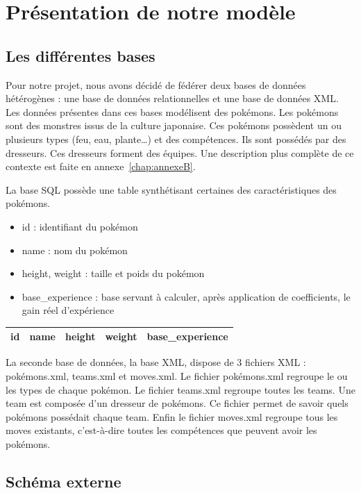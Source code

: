 \section{Présentation de notre modèle}

\subsection{Les différentes bases}

Pour notre projet, nous avons décidé de fédérer deux bases de données hétérogènes : une base de données relationnelles et une base de données XML. Les données présentes dans ces bases modélisent des pokémons. Les pokémons sont des monstres issus de la culture japonaise. Ces pokémons possèdent un ou plusieurs types (feu, eau, plante…) et des compétences. Ils sont possédés par des dresseurs. Ces dresseurs forment des équipes. Une description plus complète de ce contexte est faite en annexe~\ref{chap:annexeB}.%

La base SQL possède une table synthétisant certaines des caractéristiques des pokémons.
\begin{itemize}
\item id : identifiant du pokémon	
\item name : nom du pokémon	
\item height, weight : taille et poids du pokémon	
\item base\_experience : base servant à calculer, après application de coefficients, le gain réel d'expérience
\end{itemize}

\begin{tabular}{|c|c|c|c|c|}
 \hline
 id & name & height & weight & base\_experience \\
 \hline
\end{tabular}

La seconde base de données, la base XML, dispose de 3 fichiers XML : pokémons.xml, teams.xml et moves.xml. Le fichier pokémons.xml regroupe le ou les types de chaque pokémon. Le fichier teams.xml regroupe toutes les teams. Une team est composée d'un dresseur de pokémons. Ce fichier permet de savoir quels pokémons possédait chaque team. Enfin le fichier moves.xml regroupe tous les moves existants, c'est-à-dire toutes les compétences que peuvent avoir les pokémons.

 \subsection{Schéma externe}

